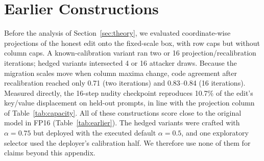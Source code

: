 \documentclass[conference]{IEEEtran}
\begin{document}
\section{Earlier Constructions}
\label{app:earlier}
Before the analysis of Section~\ref{sec:theory}, we evaluated coordinate-wise
projections of the honest edit onto the fixed-scale box, with row caps but without
column caps. A known-calibration variant ran two or 16 projection/recalibration
iterations; hedged variants intersected 4 or 16 attacker draws. Because the
migration scales move when column maxima change, code agreement after recalibration
reached only 0.71 (two iterations) and 0.83--0.84 (16 iterations). Measured directly, the 16-step nudity
checkpoint reproduces 10.7\% of the edit's key/value displacement on held-out
prompts, in line with the projection column of Table~\ref{tab:capacity}. All of these
constructions score close to the original model in FP16 (Table~\ref{tab:earlier}). The hedged variants were crafted with
$\alpha=0.75$ but deployed with the executed default $\alpha=0.5$, and one
exploratory selector used the deployer's calibration half. We therefore use none of
them for claims beyond this appendix.

\begin{table}[h]
\centering
\caption{Earlier constructions (192 images per cell; native-minus-FP16 gap with
paired crossed 95\% interval). Honest FP16 references are 0.504 (style) and 0.176
(nudity).}
\label{tab:earlier}
\end{table}
\end{document}
